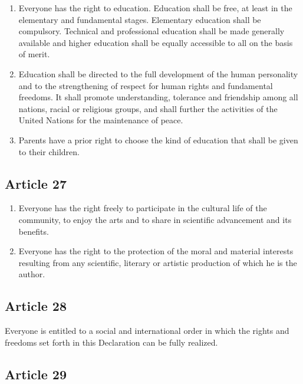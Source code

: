 \documentclass[
  titlepage,
  openright,
  DIV=calc,
  toc=listof,
  listof=nochaptergap]{scrbook}
\begin{document}
\begin{enumerate}
\def\labelenumi{\arabic{enumi}.}
\item
  Everyone has the right to education. Education shall be free, at least
  in the elementary and fundamental stages. Elementary education shall
  be compulsory. Technical and professional education shall be made
  generally available and higher education shall be equally accessible
  to all on the basis of merit.
\item
  Education shall be directed to the full development of the human
  personality and to the strengthening of respect for human rights and
  fundamental freedoms. It shall promote understanding, tolerance and
  friendship among all nations, racial or religious groups, and shall
  further the activities of the United Nations for the maintenance of
  peace.
\item
  Parents have a prior right to choose the kind of education that shall
  be given to their children.
\end{enumerate}

\subsection{Article 27}\label{article-27-2}

\begin{enumerate}
\def\labelenumi{\arabic{enumi}.}
\item
  Everyone has the right freely to participate in the cultural life of
  the community, to enjoy the arts and to share in scientific
  advancement and its benefits.
\item
  Everyone has the right to the protection of the moral and material
  interests resulting from any scientific, literary or artistic
  production of which he is the author.
\end{enumerate}

\subsection{Article 28}\label{article-28-2}

Everyone is entitled to a social and international order in which the
rights and freedoms set forth in this Declaration can be fully realized.

\subsection{Article 29}\label{article-29-2}
\end{document}
